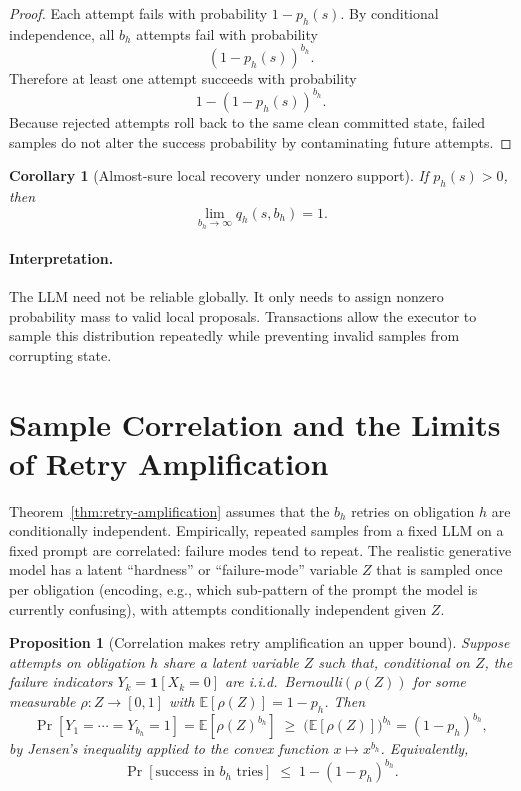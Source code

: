 \documentclass[11pt]{article}
\newtheorem{corollary}{Corollary}
\newtheorem{proposition}{Proposition}
\begin{document}
\begin{proof}
Each attempt fails with probability $1-p_h(s)$. By conditional independence, all
$b_h$ attempts fail with probability
\[
(1-p_h(s))^{b_h}.
\]
Therefore at least one attempt succeeds with probability
\[
1-(1-p_h(s))^{b_h}.
\]
Because rejected attempts roll back to the same clean committed state, failed
samples do not alter the success probability by contaminating future attempts.
\end{proof}

\begin{corollary}[Almost-sure local recovery under nonzero support]
If $p_h(s)>0$, then
\[
\lim_{b_h\to\infty} q_h(s,b_h)=1.
\]
\end{corollary}

\paragraph{Interpretation.}
The LLM need not be reliable globally. It only needs to assign nonzero
probability mass to valid local proposals. Transactions allow the executor to
sample this distribution repeatedly while preventing invalid samples from
corrupting state.

\section{Sample Correlation and the Limits of Retry Amplification}
\label{sec:correlation}

Theorem~\ref{thm:retry-amplification} assumes that the $b_h$ retries on obligation $h$ are conditionally
independent. Empirically, repeated samples from a fixed LLM on a fixed prompt
are correlated: failure modes tend to repeat. The realistic generative model
has a latent ``hardness'' or ``failure-mode'' variable $Z$ that is sampled
once per obligation (encoding, e.g., which sub-pattern of the prompt the model
is currently confusing), with attempts conditionally independent given $Z$.

\begin{proposition}[Correlation makes retry amplification an upper bound]
\label{prop:correlation-upper-bound}
Suppose attempts on obligation $h$ share a latent variable $Z$ such that,
conditional on $Z$, the failure indicators $Y_k=\mathbf{1}[X_k=0]$ are
i.i.d.\ Bernoulli$(\rho(Z))$ for some measurable $\rho:Z\to[0,1]$ with
$\mathbb{E}[\rho(Z)]=1-p_h$. Then
\[
\Pr[Y_1=\cdots=Y_{b_h}=1]
=\mathbb{E}\!\left[\rho(Z)^{b_h}\right]
\;\ge\;
\bigl(\mathbb{E}[\rho(Z)]\bigr)^{b_h}
=(1-p_h)^{b_h},
\]
by Jensen's inequality applied to the convex function $x\mapsto x^{b_h}$.
Equivalently,
\[
\Pr[\text{success in } b_h \text{ tries}]
\;\le\;
1-(1-p_h)^{b_h}.
\]
\end{proposition}
\end{document}
